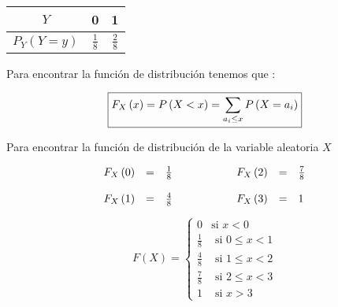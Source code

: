 \documentclass[12pt]{article}
\begin{document}
\begin{center}
    \renewcommand{\arraystretch}{1.5}
    \begin{tabular}{|c|c|c|}
        \hline
        $Y$                   & 0             & 1
        \\
        \hline
        $P_Y\left(Y=y\right)$ & $\frac{1}{8}$ & $\frac{2}{8}$
        \\
        \hline
    \end{tabular}
\end{center}


\begin{flushleft}
    Para encontrar la funci\'on de distribuci\'on tenemos que :
\end{flushleft}



\begin{equation*}
    \fbox{$\displaystyle
            F_X\left(x\right) = P \left(X <x\right) =  \sum_{a_i\le x} P \left(X = a_i\right)
        $}
\end{equation*}


\begin{flushleft}
    Para encontrar la funci\'on de distribuci\'on de la variable aleatoria $X$
\end{flushleft}


\begin{equation*}
    \begin{array}{cp{1cm}c}


        \begin{array}{rcl}
            F_X\left(0\right) & = & \frac{1}{8}
            \\
            \\
            F_X\left(1\right) & = & \frac{4}{8}
        \end{array}
         &
         &
        \begin{array}{rcl}
            F_X\left(2\right) & = & \frac{7}{8}
            \\
            \\
            F_X\left(3\right) & = & 1
        \end{array}
    \end{array}
\end{equation*}


\begin{equation*}
    F\left(X\right) = \begin{cases}
        0           & \mbox{si   $x < 0 $}
        \\
        \frac{1}{8} & \mbox{   si   $0\le x < 1$}
        \\
        \frac{4}{8} & \mbox{   si   $1\le x < 2$}
        \\
        \frac{7}{8} & \mbox{   si   $2\le x < 3$}
        \\
        1           & \mbox{     si   $x>3$}
    \end{cases}
\end{equation*}
\end{document}
